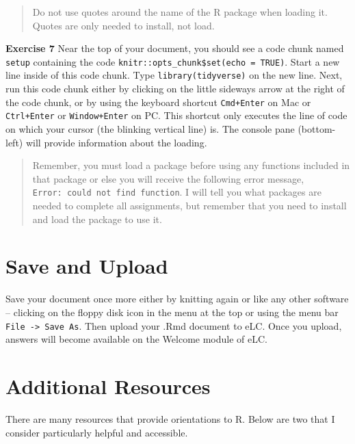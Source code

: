 \documentclass[
]{book}
\newenvironment{rmdblock}[1]
  {\begin{shaded*}
  }
  {\end{shaded*}
  }
\newenvironment{learncheck}
  {\begin{rmdblock}{warning}}
  {\end{rmdblock}}
\begin{document}
\begin{quote}
Do not use quotes around the name of the R package when loading it. Quotes are only needed to install, not load.
\end{quote}

\begin{learncheck}
\textbf{Exercise 7} Near the top of your document, you should see a code
chunk named \texttt{setup} containing the code
\texttt{knitr::opts\_chunk\$set(echo\ =\ TRUE)}. Start a new line inside
of this code chunk. Type \texttt{library(tidyverse)} on the new line.
Next, run this code chunk either by clicking on the little sideways
arrow at the right of the code chunk, or by using the keyboard shortcut
\texttt{Cmd+Enter} on Mac or \texttt{Ctrl+Enter} or
\texttt{Window+Enter} on PC. This shortcut only executes the line of
code on which your cursor (the blinking vertical line) is. The console
pane (bottom-left) will provide information about the loading.
\end{learncheck}

\begin{quote}
Remember, you must load a package before using any functions included in that package or else you will receive the following error message, \texttt{Error:\ could\ not\ find\ function}. I will tell you what packages are needed to complete all assignments, but remember that you need to install and load the package to use it.
\end{quote}

\hypertarget{save-and-upload}{%
\section{Save and Upload}\label{save-and-upload}}

Save your document once more either by knitting again or like any other software -- clicking on the floppy disk icon in the menu at the top or using the menu bar \texttt{File\ -\textgreater{}\ Save\ As}. Then upload your .Rmd document to eLC. Once you upload, answers will become available on the Welcome module of eLC.

\hypertarget{additional-resources}{%
\section{Additional Resources}\label{additional-resources}}

There are many resources that provide orientations to R. Below are two that I consider particularly helpful and accessible.
\end{document}
